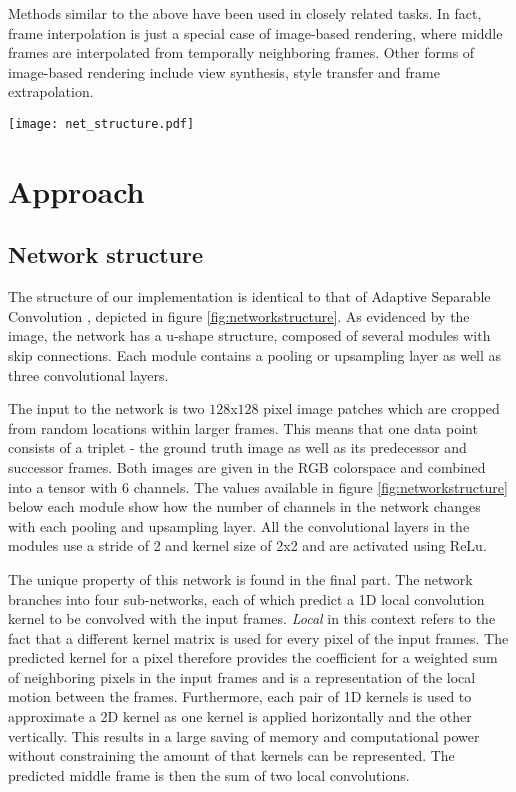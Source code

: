 \documentclass[10pt,twocolumn,letterpaper]{article}
\begin{document}
Methods similar to the above have been used in closely related tasks. In fact, frame interpolation is just a special case of image-based rendering, where middle frames are interpolated from temporally neighboring frames. Other forms of image-based rendering include view synthesis, style transfer and frame extrapolation.

\begin{figure*}
    \begin{center}
    	\texttt{[image: net\_structure.pdf]}
    \end{center}
    \caption{Structure of the implemented network. Image from \citeauthor{SepConv}}
    \label{fig:networkstructure}
\end{figure*}


\section{Approach}
\label{sec:approach}


\subsection{Network structure}
The structure of our implementation is identical to that of Adaptive Separable Convolution \cite{SepConv}, depicted in figure \ref{fig:networkstructure}. As evidenced by the image, the network has a u-shape structure, composed of several modules with skip connections. Each module contains a pooling or upsampling layer as well as three convolutional layers.

The input to the network is two $128$x$128$ pixel image patches which are cropped from random locations within larger frames. This means that one data point consists of a triplet - the ground truth image as well as its predecessor and successor frames. Both images are given in the RGB colorspace and combined into a tensor with 6 channels. The values available in figure \ref{fig:networkstructure} below each module show how the number of channels in the network changes with each pooling and upsampling layer. All the convolutional layers in the modules use a stride of 2 and kernel size of 2x2 and are activated using ReLu.

The unique property of this network is found in the final part. The network branches into four sub-networks, each of which predict a 1D local convolution kernel to be convolved with the input frames. \textit{Local} in this context refers to the fact that a different kernel matrix is used for every pixel of the input frames. The predicted kernel for a pixel therefore provides the coefficient for a weighted sum of neighboring pixels in the input frames and is a representation of the local motion between the frames. Furthermore, each pair of 1D kernels is used to approximate a 2D kernel as one kernel is applied horizontally and the other vertically. This results in a large saving of memory and computational power without constraining the amount of that kernels can be represented. The predicted middle frame is then the sum of two local convolutions.
\end{document}
